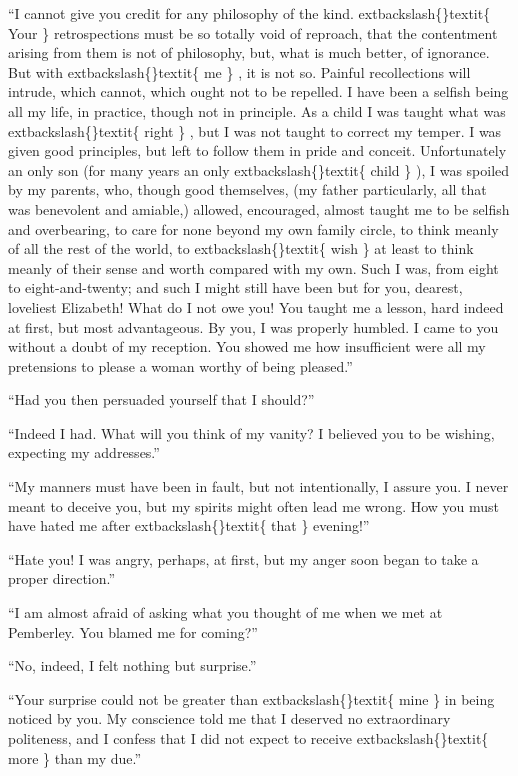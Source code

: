 \documentclass[10pt]{book}
\begin{document}
   “I cannot give you credit for any philosophy of the kind.
   	extbackslash\{\}textit\{
    Your
   \}
   retrospections must be so totally void of reproach, that the contentment
arising from them is not of philosophy, but, what is much better, of
ignorance. But with
   	extbackslash\{\}textit\{
    me
   \}
   , it is not so. Painful recollections will
intrude, which cannot, which ought not to be repelled. I have been a
selfish being all my life, in practice, though not in principle. As a
child I was taught what was
   	extbackslash\{\}textit\{
    right
   \}
   , but I was not taught to correct my
temper. I was given good principles, but left to follow them in pride
and conceit. Unfortunately an only son (for many years an only
   	extbackslash\{\}textit\{
    child
   \}
   ),
I was spoiled by my parents, who, though good themselves, (my father
particularly, all that was benevolent and amiable,) allowed, encouraged,
almost taught me to be selfish and overbearing, to care for none beyond
my
   own family circle, to think meanly of all the rest of the world, to
   	extbackslash\{\}textit\{
    wish
   \}
   at least to think meanly of their sense and worth compared with
my own. Such I was, from eight to eight-and-twenty; and such I might
still have been but for you, dearest, loveliest Elizabeth! What do I not
owe you! You taught me a lesson, hard indeed at first, but most
advantageous. By you, I was properly humbled. I came to you without a
doubt of my reception. You showed me how insufficient were all my
pretensions to please a woman worthy of being pleased.”
  

   “Had you then persuaded yourself that I should?”
  

   “Indeed I had. What will you think of my vanity? I believed you to be
wishing, expecting my addresses.”
  

   “My manners must have been in fault, but not intentionally, I assure
you. I never meant to deceive you, but my spirits might often lead me
wrong. How you must have hated me after
   	extbackslash\{\}textit\{
    that
   \}
   evening!”
  

   “Hate you! I was angry, perhaps, at first, but my anger soon began to
take a proper direction.”
  

   “I am almost afraid of asking what you thought of me when we met at
Pemberley. You blamed me for coming?”
  

   “No, indeed, I felt nothing but surprise.”
  

   “Your surprise could not be greater than
   	extbackslash\{\}textit\{
    mine
   \}
   in being noticed by you.
My conscience told me that I deserved no extraordinary politeness, and I
confess that I did not expect to receive
   	extbackslash\{\}textit\{
    more
   \}
   than my due.”
  
\end{document}
